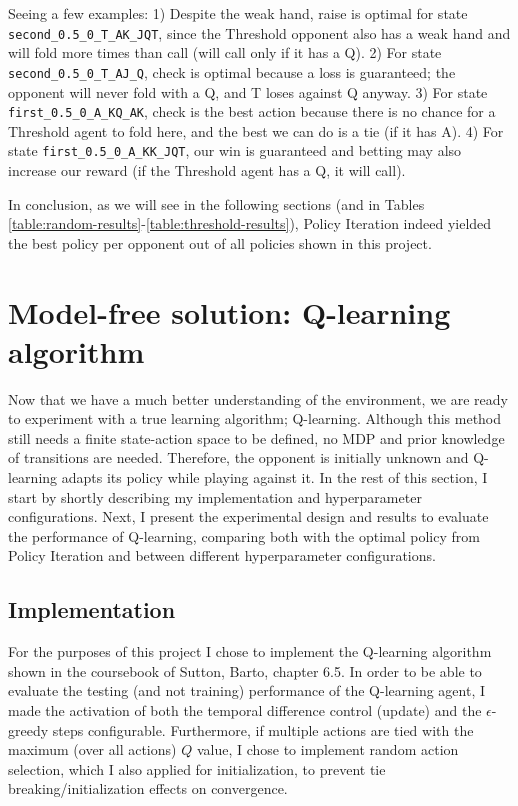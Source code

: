 Seeing a few examples: 1) Despite the weak hand, raise is optimal for state \Verb|second_0.5_0_T_AK_JQT|, since the Threshold opponent also has a weak hand and will fold more times than call (will call only if it has a Q). 2) For state \Verb|second_0.5_0_T_AJ_Q|, check is optimal because a loss is guaranteed; the opponent will never fold with a Q, and T loses against Q anyway. 3) For state \Verb|first_0.5_0_A_KQ_AK|, check is the best action because there is no chance for a Threshold agent to fold here, and the best we can do is a tie (if it has A). 4) For state \Verb|first_0.5_0_A_KK_JQT|, our win is guaranteed and betting may also increase our reward (if the Threshold agent has a Q, it will call).

In conclusion, as we will see in the following sections (and in Tables \ref{table:random-results}-\ref{table:threshold-results}), Policy Iteration indeed yielded the best policy per opponent out of all policies shown in this project.

\section{Model-free solution: Q-learning algorithm}

Now that we have a much better understanding of the environment, we are ready to experiment with a true learning algorithm; Q-learning. Although this method still needs a finite state-action space to be defined, no MDP and prior knowledge of transitions are needed. Therefore, the opponent is initially unknown and Q-learning adapts its policy while playing against it. In the rest of this section, I start by shortly describing my implementation and hyperparameter configurations. Next, I present the experimental design and results to evaluate the performance of Q-learning, comparing both with the optimal policy from Policy Iteration and between different hyperparameter configurations.

\subsection{Implementation}

For the purposes of this project I chose to implement the Q-learning algorithm shown in the coursebook of Sutton, Barto, chapter 6.5. In order to be able to evaluate the testing (and not training) performance of the Q-learning agent, I made the activation of both the temporal difference control (update) and the $\epsilon$-greedy steps configurable. Furthermore, if multiple actions are tied with the maximum (over all actions) $Q$ value, I chose to implement random action selection, which I also applied for initialization, to prevent tie breaking/initialization effects on convergence.

